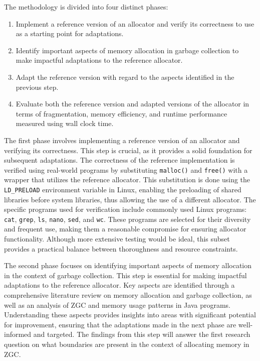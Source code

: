
The methodology is divided into four distinct phases:

\begin{enumerate}
    \item Implement a reference version of an allocator and verify its correctness to use as a starting point for adaptations.
    \item Identify important aspects of memory allocation in garbage collection to make impactful adaptations to the reference allocator.
    \item Adapt the reference version with regard to the aspects identified in the previous step.
    \item Evaluate both the reference version and adapted versions of the allocator in terms of fragmentation, memory efficiency, and runtime performance measured using wall clock time.
\end{enumerate}

The first phase involves implementing a reference version of an allocator and verifying its correctness. This step is crucial, as it provides a solid foundation for subsequent adaptations. The correctness of the reference implementation is verified using real-world programs by substituting \texttt{malloc()} and \texttt{free()} with a wrapper that utilizes the reference allocator. This substitution is done using the \texttt{LD\_PRELOAD} environment variable in Linux, enabling the preloading of shared libraries before system libraries, thus allowing the use of a different allocator. The specific programs used for verification include commonly used Linux programs: \texttt{cat}, \texttt{grep}, \texttt{ls}, \texttt{nano}, \texttt{sed}, and \texttt{wc}. These programs are selected for their diversity and frequent use, making them a reasonable compromise for ensuring allocator functionality. Although more extensive testing would be ideal, this subset provides a practical balance between thoroughness and resource constraints.

The second phase focuses on identifying important aspects of memory allocation in the context of garbage collection. This step is essential for making impactful adaptations to the reference allocator. Key aspects are identified through a comprehensive literature review on memory allocation and garbage collection, as well as an analysis of ZGC and memory usage patterns in Java programs. Understanding these aspects provides insights into areas with significant potential for improvement, ensuring that the adaptations made in the next phase are well-informed and targeted. The findings from this step will answer the first research question on what boundaries are present in the context of allocating memory in ZGC.

